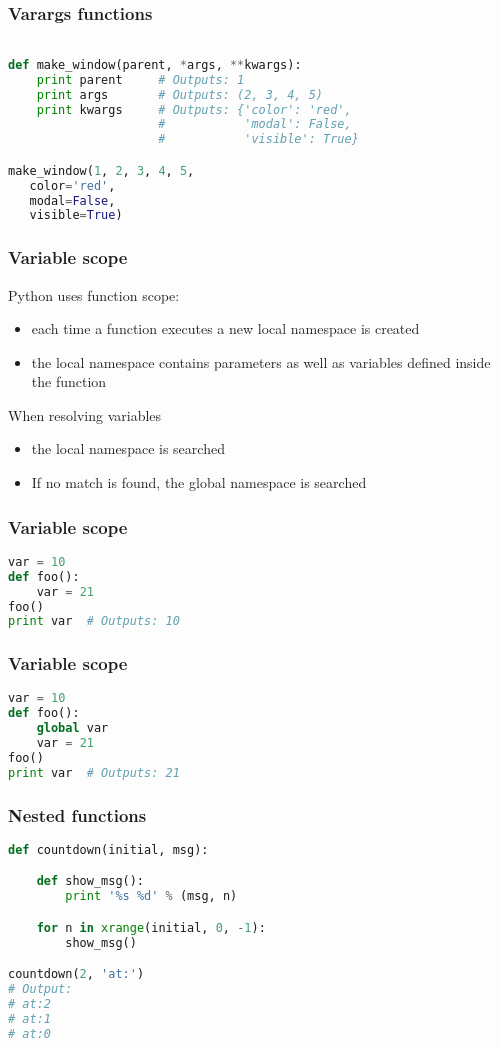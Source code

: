 \documentclass{beamer}
\begin{document}
\begin{frame}[fragile]
\frametitle{Varargs functions}

\begin{lstlisting}[language=python]

def make_window(parent, *args, **kwargs):
    print parent     # Outputs: 1
    print args       # Outputs: (2, 3, 4, 5)
    print kwargs     # Outputs: {'color': 'red', 
                     #           'modal': False,
                     #           'visible': True}

make_window(1, 2, 3, 4, 5,
   color='red',
   modal=False,
   visible=True)

\end{lstlisting}
\end{frame}

\begin{frame}[fragile]
\frametitle{Variable scope}
Python uses function scope:
\begin{itemize}
 \item each time a function executes a new local namespace is created
 \item the local namespace contains parameters as well as variables defined inside the function
\end{itemize}
\vspace{5 mm}
When resolving variables
\begin{itemize}
  \item the local namespace is searched
  \item If no match is found, the global namespace is searched  
\end{itemize}

\end{frame}

\begin{frame}[fragile]
\frametitle{Variable scope}
\begin{lstlisting}[language=python]
var = 10
def foo():
    var = 21
foo()
print var  # Outputs: 10
\end{lstlisting}
\end{frame}

\begin{frame}[fragile]
\frametitle{Variable scope}
\begin{lstlisting}[language=python]
var = 10
def foo():
    global var
    var = 21
foo()
print var  # Outputs: 21
\end{lstlisting}
\end{frame}

\begin{frame}[fragile]
\frametitle{Nested functions}
\begin{lstlisting}[language=python]
def countdown(initial, msg):

    def show_msg():
        print '%s %d' % (msg, n)

    for n in xrange(initial, 0, -1):
        show_msg()

countdown(2, 'at:')
# Output:
# at:2
# at:1
# at:0
\end{lstlisting}
\end{frame}
\end{document}
